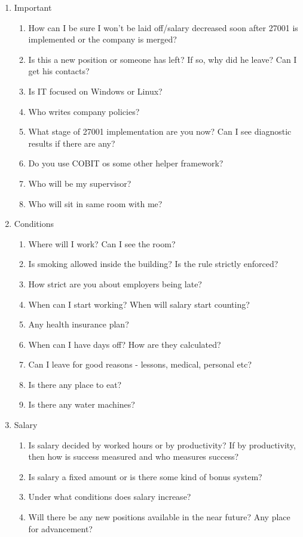 \documentclass{article}
\begin{document}
\begin{enumerate}
\item Important
	\begin{enumerate}
		\item How can I be sure I won't be laid off/salary decreased soon after 27001 is implemented or the company is merged?
		\item Is this a new position or someone has left? If so, why did he leave? Can I get his contacts?
		\item Is IT focused on Windows or Linux?
		\item Who writes company policies?
		\item What stage of 27001 implementation are you now? Can I see diagnostic results if there are any?
		\item Do you use COBIT os some other helper framework?
		\item Who will be my supervisor?
		\item Who will sit in same room with me?
	\end{enumerate}

\item Conditions
	\begin{enumerate}
		\item Where will I work? Can I see the room?
		\item Is smoking allowed inside the building? Is the rule strictly enforced?
		\item How strict are you about employers being late?
		\item When can I start working? When will salary start counting?
		\item Any health insurance plan?
		\item When can I have days off? How are they calculated?
		\item Can I leave for good reasons - lessons, medical, personal etc?
		\item Is there any place to eat?
		\item Is there any water machines?
	\end{enumerate}

\item Salary
	\begin{enumerate}
		\item Is salary decided by worked hours or by productivity? If by productivity, then how is success measured and who measures success?
		\item Is salary a fixed amount or is there some kind of bonus system?
		\item Under what conditions does salary increase?
		\item Will there be any new positions available in the near future? Any place for advancement?
	\end{enumerate}
\end{enumerate}
\end{document}
